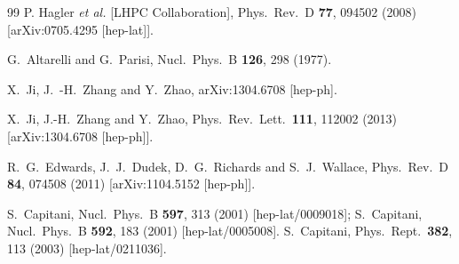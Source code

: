 \begin{thebibliography}{99}
  P. Hagler {\it et al.}  [LHPC Collaboration],
  Phys.\ Rev.\ D {\bf 77}, 094502 (2008)
  [arXiv:0705.4295 [hep-lat]].


  G.~Altarelli and G.~Parisi,
  Nucl.\ Phys.\ B {\bf 126}, 298 (1977).


  X.~Ji, J.~-H.~Zhang and Y.~Zhao,
  arXiv:1304.6708 [hep-ph].

  X.~Ji, J.-H.~Zhang and Y.~Zhao,
  Phys.\ Rev.\ Lett.\  {\bf 111}, 112002 (2013)
  [arXiv:1304.6708 [hep-ph]].


  R.~G.~Edwards, J.~J.~Dudek, D.~G.~Richards and S.~J.~Wallace,
  Phys.\ Rev.\ D {\bf 84}, 074508 (2011)
  [arXiv:1104.5152 [hep-ph]].


  S.~Capitani,
  Nucl.\ Phys.\ B {\bf 597}, 313 (2001)
  [hep-lat/0009018]; %
  S.~Capitani,
  Nucl.\ Phys.\ B {\bf 592}, 183 (2001)
  [hep-lat/0005008].
  S.~Capitani,
  Phys.\ Rept.\  {\bf 382}, 113 (2003)
  [hep-lat/0211036].


\end{thebibliography}

